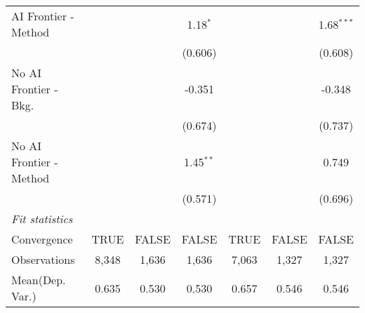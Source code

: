 \begin{tabular}{lcccccc}
   AI Frontier - Method    &               &             & 1.18$^{*}$   &               &              & 1.68$^{***}$\\   
                           &               &             & (0.606)      &               &              & (0.608)\\   
   No AI Frontier - Bkg.   &               &             & -0.351       &               &              & -0.348\\   
                           &               &             & (0.674)      &               &              & (0.737)\\   
   No AI Frontier - Method &               &             & 1.45$^{**}$  &               &              & 0.749\\   
                           &               &             & (0.571)      &               &              & (0.696)\\   
   \midrule
   \emph{Fit statistics}\\
   Convergence             &TRUE           & FALSE       & FALSE        & TRUE          & FALSE        & FALSE\\  
   Observations            & 8,348         & 1,636       & 1,636        & 7,063         & 1,327        & 1,327\\  
Mean(Dep. Var.) & 0.635 & 0.530 & 0.530 & 0.657 & 0.546 & 0.546 \\
   

\end{tabular}
